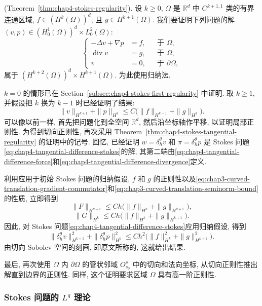 \begin{Proof}
(Theorem~\ref{thm:chap4-stokes-regularity}).
设 $k\geq0$, $\Omega$ 是 $\mathbb R^d$ 中 $C^{k+1,1}$ 类的有界连通区域, $f\in(H^k(\Omega))^d$, 且 $g\in H^{k+1}(\Omega)$. 我们要证明下列问题的解 $(v,p)\in(H_0^1(\Omega))^d\times L_0^2(\Omega)$:
\[
 \left\{
 \begin{aligned}
  -\Delta v+\nabla p&=f,&&\text{于 }\Omega,\\
  \operatorname{div}v&=g,&&\text{于 }\Omega,\\
  v&=0,&&\text{于 }\partial\Omega,
 \end{aligned}
 \right.
\]
属于 $(H^{k+2}(\Omega))^d\times H^{k+1}(\Omega)$. 为此使用归纳法.

$k=0$ 的情形已在 Section~\ref{subsec:chap4-stokes-first-regularity} 中证明. 取 $k\geq1$, 并假设把 $k$ 换为 $k-1$ 时已经证明了结果:
\[
 \|v\|_{H^{k+1}}+\|p\|_{H^k}
 \leq C\bigl(\|f\|_{H^{k-1}}+\|g\|_{H^k}\bigr).
\]
可以像以前一样, 首先把问题化到全空间 $\mathbb R^d$, 然后沿坐标轴作平移, 以证明局部正则性. 为得到切向正则性, 再次采用 Theorem~\ref{thm:chap4-stokes-tangential-regularity} 的证明中的记号. 回忆, 已经证明 $w=\delta_h^\theta v$ 和 $\pi=\delta_h^\theta p$ 是 Stokes 问题\eqref{eq:chap4-tangential-difference-stokes}的解, 其第二端由\eqref{eq:chap4-tangential-difference-force}和\eqref{eq:chap4-tangential-difference-divergence}定义.

利用应用于初始 Stokes 问题的归纳假设, $f$ 和 $g$ 的正则性以及\eqref{eq:chap3-curved-translation-gradient-commutator}和\eqref{eq:chap3-curved-translation-seminorm-bound}的性质, 立即得到
\[
 \|F\|_{H^{k-1}}\leq Ch\bigl(\|f\|_{H^k}+\|g\|_{H^{k+1}}\bigr),
\]
\[
 \|G\|_{H^k}\leq Ch\bigl(\|f\|_{H^k}+\|g\|_{H^{k+1}}\bigr).
\]
因此, 对 Stokes 问题\eqref{eq:chap4-tangential-difference-stokes}应用归纳假设, 得到
\[
 \|\delta_h^\theta v\|_{H^{k+1}}^2+\|\delta_h^\theta p\|_{H^k}^2
 \leq Ch^2\bigl(\|f\|_{H^k}^2+\|g\|_{H^{k+1}}^2\bigr).
\]
由切向 Sobolev 空间的刻画, 即原文所称的, 这就给出结果.

最后, 再次使用 $\Omega$ 内 $\partial\Omega$ 的管状邻域 $O_{s_0}^\rho$ 中的切向和法向坐标, 从切向正则性推出解直到边界的正则性. 同样, 这个证明要求区域 $\Omega$ 具有高一阶正则性.
\end{Proof}

\subsubsection{Stokes 问题的 $L^q$ 理论}
\label{subsec:chap4-stokes-lq-theory}

